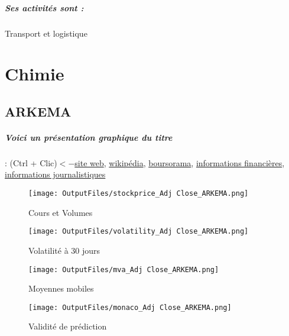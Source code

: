 \documentclass[11pt,a4paper]{report}%
\begin{document}
\paragraph{Ses activités sont : } Transport et logistique 
    
    \newpage\chapter{Chimie}


\section{ARKEMA}

\paragraph{Voici un présentation graphique du titre} : (Ctrl + Clic)$<-$\href{https://www.arkema.com/fr/investisseurs/}{site web}, \href{https://fr.wikipedia.org/wiki/Arkema}{wikipédia}, \href{https://www.boursorama.com/cours/1rPAKE}{boursorama}, \href{https://www.qwant.com/?q=site:https:%2f%2fwww.easybourse.com%2faction-societe%2fARKEMA&t=web&client=ext-firefox-hp}{informations financières}, \href{https://bourse.lerevenu.com/cours-de-bourse/fiche-valeur-synthese/ARKEMA/AKE-FR}{informations journalistiques}
\begin{figure}[!htb]
   \begin{minipage}{0.5\textwidth}
     \centering
     \texttt{[image: OutputFiles/stockprice\_Adj Close\_ARKEMA.png]}
     \caption{Cours et Volumes}\label{Fig:price_ARKEMA}
   \end{minipage}\hfill
   \begin{minipage}{0.5\textwidth}
     \centering
     \texttt{[image: OutputFiles/volatility\_Adj Close\_ARKEMA.png]}
     \caption{Volatilité à 30 jours}\label{Fig:volat_ARKEMA}
   \end{minipage}
\end{figure}
\begin{figure}[!htb]
   \begin{minipage}{0.5\textwidth}
     \centering
     \texttt{[image: OutputFiles/mva\_Adj Close\_ARKEMA.png]}
     \caption{Moyennes mobiles}\label{Fig:mva_ARKEMA}
   \end{minipage}\hfill
   \begin{minipage}{0.5\textwidth}
     \centering
     \texttt{[image: OutputFiles/monaco\_Adj Close\_ARKEMA.png]}
     \caption{Validité de prédiction}\label{Fig:prediction_ARKEMA}
   \end{minipage}
\end{figure}
\end{document}
